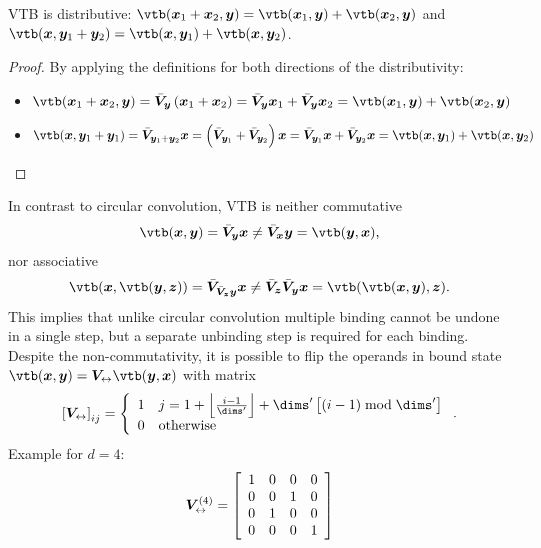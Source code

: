\begin{corollary}
    VTB is distributive: $\vtb(\vc x_1 + \vc x_2, \vc y) = \vtb(\vc x_1, \vc y) + \vtb(\vc x_2, \vc y)$ and $\vtb(\vc x, \vc y_1 + \vc y_2) = \vtb(\vc x, \vc y_1) + \vtb(\vc x, \vc y_2)$.
    \begin{proof}
        By applying the definitions for both directions of the distributivity:
        \begin{itemize}
            \item $\vtb(\vc x_1 + \vc x_2, \vc y) = \bar{\mat V}_{\vc y} \del{\vc x_1 + \vc x_2} = \bar{\mat V}_{\vc y} \vc x_1 + \bar{\mat V}_{\vc y} \vc x_2 = \vtb(\vc x_1, \vc y) + \vtb(\vc x_2, \vc y)$
            \item $\vtb(\vc x, \vc y_1 + \vc y_1) = \bar{\mat V}_{\vc y_1 + \vc y_2} \vc x = \del{\bar{\mat V}_{\vc y_1} + \bar{\mat V}_{\vc y_2}} \vc x = \bar{\mat V}_{\vc y_1} \vc x + \bar{\mat V}_{\vc y_2} \vc x = \vtb(\vc x, \vc y_1) + \vtb(\vc x, \vc y_2)$
    \end{itemize}
    \end{proof}
\end{corollary}
In contrast to circular convolution, VTB is neither commutative
\begin{equation}
    \vtb(\vc x, \vc y) = \bar{\mat V}_{\vc y} \vc x \neq \bar{\mat V}_{\vc x} \vc y = \vtb(\vc y, \vc x) \text{,}
\end{equation}
nor associative
\begin{equation}
    \vtb(\vc x, \vtb(\vc y, \vc z)) = \bar{\mat V}_{\bar{\mat V}_{\vc z} \vc y} \vc x \neq \bar{\mat V}_{\vc z} \bar{\mat V}_{\vc y} \vc x = \vtb(\vtb(\vc x, \vc y), \vc z) \text{.}
\end{equation}
This implies that unlike circular convolution multiple binding cannot be undone in a single step, but a separate unbinding step is required for each binding.
Despite the non-commutativity, it is possible to flip the operands in bound state $\vtb(\vc x, \vc y) = \mat V_{\leftrightarrow} \vtb(\vc y, \vc x)$ with matrix
\begin{equation}
    \sbr{\mat V_{\leftrightarrow}}_{ij} = \left\{ \begin{array}{ll}
            1 & j = 1 + \left\lfloor \frac{i - 1}{\dims'} \right\rfloor + \dims' \sbr{\del{i - 1} \bmod \dims'} \\
            0 & \text{otherwise}
        \end{array}\right. \text{.}
\end{equation}
Example for $d = 4$:
\begin{equation*}
    \mat V_{\leftrightarrow}^{(4)} = \sbr{\begin{array}{cccc}
            1 & 0 & 0 & 0 \\
            0 & 0 & 1 & 0 \\
            0 & 1 & 0 & 0 \\
            0 & 0 & 0 & 1
        \end{array}}
\end{equation*}

